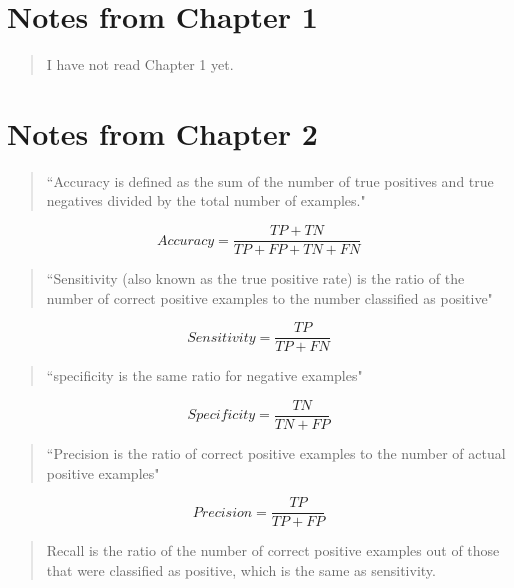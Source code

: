 \documentclass[12pt]{article}
\begin{document}
\maketitle

\section{Notes from Chapter 1}
\begin{verse}
I have not read Chapter 1 yet.
\end{verse}

\section{Notes from Chapter 2}
\begin{verse}
``Accuracy is defined as the sum of the number of true positives and true negatives divided by the total number of examples."
\end{verse}

\begin{equation}
Accuracy = \frac{TP + TN}{TP + FP + TN + FN}
\end{equation}

\begin{verse}
``Sensitivity (also known as the true positive rate) is the ratio of the number of correct positive examples to the number classified as positive"
\end{verse}

\begin{equation}
Sensitivity = \frac{TP}{TP + FN}
\end{equation}

\begin{verse}
``specificity is the same ratio for negative examples"
\end{verse}

\begin{equation}
Specificity = \frac{TN}{TN + FP}
\end{equation}

\begin{verse}
``Precision is the ratio of correct positive examples to the number of actual positive examples"
\end{verse}

\begin{equation}
Precision = \frac{TP}{TP + FP}
\end{equation}

\begin{verse}
Recall is the ratio of the number of correct positive examples out of those that were classified as positive, which is the same as sensitivity.
\end{verse}
\end{document}
